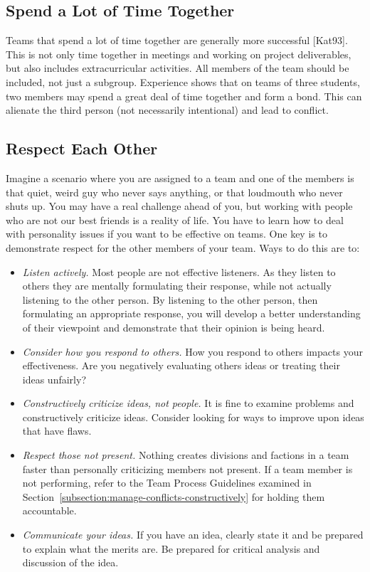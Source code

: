 \subsection{Spend a Lot of Time Together}
\label{subsection:spend-a-lot-of-time-together}

Teams that spend a lot of time together are generally more successful
{[}Kat93{]}. This is not only time together in meetings and working on
project deliverables, but also includes extracurricular activities. All
members of the team should be included, not just a subgroup. Experience
shows that on teams of three students, two members may spend a great
deal of time together and form a bond. This can alienate the third
person (not necessarily intentional) and lead to conflict.

\subsection{Respect Each Other}
\label{subsection:respect-each-other}

Imagine a scenario where you are assigned to a team and one of the
members is that quiet, weird guy who never says anything, or that
loudmouth who never shuts up. You may have a real challenge ahead of
you, but working with people who are not our best friends is a reality
of life. You have to learn how to deal with personality issues if you
want to be effective on teams. One key is to demonstrate respect for the
other members of your team. Ways to do this are to:

\begin{itemize}
\item
  \emph{Listen actively.} Most people are not effective listeners. As
  they listen to others they are mentally formulating their response,
  while not actually listening to the other person. By listening to the
  other person, then formulating an appropriate response, you will
  develop a better understanding of their viewpoint and demonstrate that
  their opinion is being heard.
\item
  \emph{Consider how you respond to others.} How you respond to others
  impacts your effectiveness. Are you negatively evaluating others ideas
  or treating their ideas unfairly?
\item
  \emph{Constructively criticize ideas, not people.} It is fine to
  examine problems and constructively criticize ideas. Consider looking
  for ways to improve upon ideas that have flaws.
\item
  \emph{Respect those not present.} Nothing creates divisions and
  factions in a team faster than personally criticizing members not
  present. If a team member is not performing, refer to the Team Process
  Guidelines examined in Section~\ref{subsection:manage-conflicts-constructively} 
  for holding them accountable.
\item
  \emph{Communicate your ideas.} If you have an idea, clearly state it
  and be prepared to explain what the merits are. Be prepared for
  critical analysis and discussion of the idea.
\end{itemize}

